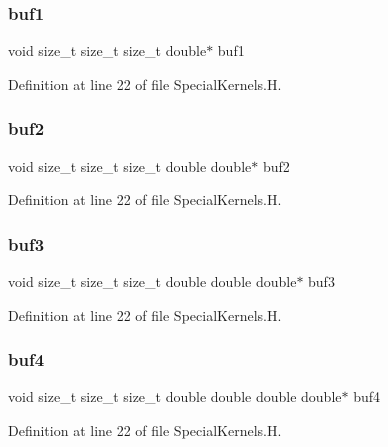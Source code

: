 \subsubsection{\texorpdfstring{buf1}{buf1}}
{\footnotesize\ttfamily void size\+\_\+t size\+\_\+t size\+\_\+t double$\ast$ buf1}



Definition at line 22 of file Special\+Kernels.\+H.

\hypertarget{SpecialKernels_8H_ab3bc18ad1957d5cb9c2b612e89df900d}{}\label{SpecialKernels_8H_ab3bc18ad1957d5cb9c2b612e89df900d} 
\subsubsection{\texorpdfstring{buf2}{buf2}}
{\footnotesize\ttfamily void size\+\_\+t size\+\_\+t size\+\_\+t double double$\ast$ buf2}



Definition at line 22 of file Special\+Kernels.\+H.

\hypertarget{SpecialKernels_8H_abcaabc21103d12066791d03652cf9d07}{}\label{SpecialKernels_8H_abcaabc21103d12066791d03652cf9d07} 
\subsubsection{\texorpdfstring{buf3}{buf3}}
{\footnotesize\ttfamily void size\+\_\+t size\+\_\+t size\+\_\+t double double double$\ast$ buf3}



Definition at line 22 of file Special\+Kernels.\+H.

\hypertarget{SpecialKernels_8H_aa0bc16bfee801837492416db85dff90c}{}\label{SpecialKernels_8H_aa0bc16bfee801837492416db85dff90c} 
\subsubsection{\texorpdfstring{buf4}{buf4}}
{\footnotesize\ttfamily void size\+\_\+t size\+\_\+t size\+\_\+t double double double double$\ast$ buf4}



Definition at line 22 of file Special\+Kernels.\+H.


